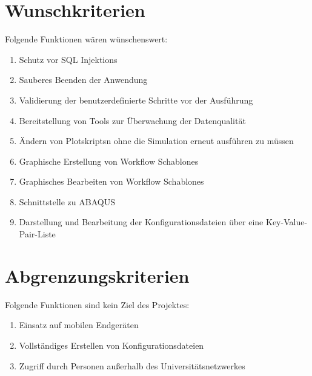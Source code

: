 \section{Wunschkriterien}
Folgende Funktionen wären wünschenswert:
\renewcommand{\labelenumi}{/W\arabic{enumi}0/}
\begin{enumerate}
    \setlength\itemsep{-1em}
    \item Schutz vor \gls{SQL} \glspl{Injektion}
    \item Sauberes Beenden der Anwendung
    \item Validierung der benutzerdefinierte Schritte vor der Ausführung
    \item Bereitstellung von Tools zur Überwachung der Datenqualität
    \item Ändern von \glspl{Plotskript}n ohne die Simulation erneut ausführen zu müssen
    \item Graphische Erstellung von \glspl{Workflow Schablone}
    \item Graphisches Bearbeiten von \glspl{Workflow Schablone}
    \item Schnittstelle zu \gls{ABAQUS}
    \item Darstellung und Bearbeitung der Konfigurationsdateien über eine \gls{Key-Value-Pair}-Liste
\end{enumerate}

\section{Abgrenzungskriterien}
Folgende Funktionen sind kein Ziel des Projektes:
\renewcommand{\labelenumi}{/A\arabic{enumi}0/}
\begin{enumerate}
    \setlength\itemsep{-1em}
    \item Einsatz auf mobilen Endgeräten
    \item Vollständiges Erstellen von Konfigurationsdateien
    \item Zugriff durch Personen außerhalb des Universitätsnetzwerkes 
\end{enumerate}
\renewcommand{\labelenumi}{\arabic{enumi}}